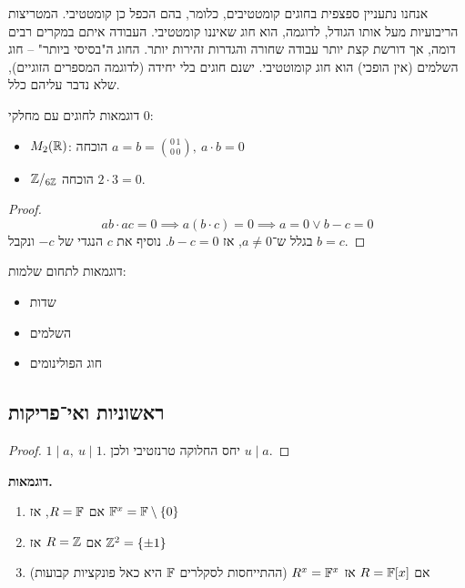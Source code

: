 \documentclass[name=רשימות אלגברה לינארית 2א]{../../../tex/classes/megasumPreamble}
\begin{document}
	אנחנו נתעניין ספצפית בחוגים קומטטיבים, כלומר, בהם הכפל כן קומטטיבי. המטריצות הריבועיות מעל אותו הגודל, לדוגמה, הוא חוג שאיננו קומטטיבי. העבודה איתם במקרים רבים דומה, אך דורשת קצת יותר עבודה שחורה והגדרות זהירות יותר. החוג ה"בסיסי ביותר" – חוג השלמים (אין הופכי) הוא חוג קומוטטיבי. ישנם חוגים בלי יחידה (לדוגמה המספרים הזוגיים), שלא נדבר עליהם כלל. 
	
	
	דוגמאות לחוגים עם מחלקי $0$: 
	\begin{itemize}
		\item $M_2(\mathbb{R})$: הוכחה $a = b = \binom{0\, 1}{0\, 0}, \ a \cdot b = 0$
		\item $\mathbb{Z}/_{6\mathbb{Z}}$ הוכחה $2 \cdot 3 = 0$. 
	\end{itemize}
	
	
	\begin{proof}
		\[ ab  \cdot ac = 0 \implies a(b \cdot c) = 0 \implies a = 0 \lor b - c = 0 \]
		בגלל ש־$a \neq 0$, אז $b - c = 0$. נוסיף את $c$ הנגדי של $-c$ ונקבל $b = c$. 
	\end{proof}
	
	דוגמאות לתחום שלמות: 
	\begin{itemize}
		\item שדות
		\item השלמים
		\item חוג הפולינומים
	\end{itemize}
	
	\subsection{ראשוניות ואי־פריקות}
	\begin{proof}
		$1 \mid a, \ u \mid 1$. יחס החלוקה טרנזטיבי ולכן $u \mid a$. 
	\end{proof}
	\textbf{דוגמאות. }
	\begin{enumerate}
		\item אם $R = \mathbb{F}$, אז $\mathbb{F}^x = \mathbb{F} \setminus \{0\}$
		\item אם $R = \mathbb{Z}$ אז $\mathbb{Z}^2 = \{\pm 1\}$
		\item אם $R = \mathbb{F}[x]$ אז $R^x = \mathbb{F}^x$ (ההתייחסות לסקלרים $\mathbb{F}$ היא כאל פונקציות קבועות)
	\end{enumerate}
	
\end{document}
